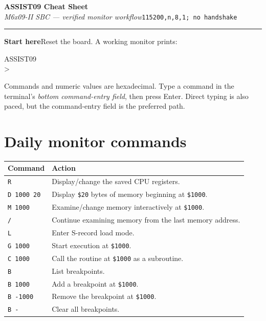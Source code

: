 \documentclass[9pt,a4paper]{article}
\newcommand{\cmd}[1]{\texttt{#1}}
\newcommand{\hex}[1]{\texttt{\$#1}}
\begin{document}
\pagestyle{empty}

{\LARGE\bfseries ASSIST09 Cheat Sheet}\\[-1pt]
\textit{M6x09-II SBC --- verified monitor workflow}\hfill\texttt{115200,n,8,1; no handshake}

\vspace{4pt}
\hrule
\vspace{5pt}

\textbf{Start here}\quad Reset the board.  A working monitor prints:

\begin{center}
\begin{minipage}{0.42\linewidth}
\ttfamily
ASSIST09\\
>
\end{minipage}
\end{center}

Commands and numeric values are hexadecimal.  Type a command in the terminal's \emph{bottom command-entry field}, then press Enter.  Direct typing is also paced, but the command-entry field is the preferred path.

\section*{Daily monitor commands}

\begin{tabularx}{\linewidth}{@{}>{\ttfamily}p{30mm}X@{}}
\toprule
\normalfont\textbf{Command} & \textbf{Action} \\
\midrule
\cmd{R} & Display/change the saved CPU registers. \\
\cmd{D 1000 20} & Display \hex{20} bytes of memory beginning at \hex{1000}. \\
\cmd{M 1000} & Examine/change memory interactively at \hex{1000}. \\
\cmd{/} & Continue examining memory from the last memory address. \\
\cmd{L} & Enter S-record load mode. \\
\cmd{G 1000} & Start execution at \hex{1000}. \\
\cmd{C 1000} & Call the routine at \hex{1000} as a subroutine. \\
\cmd{B} & List breakpoints. \\
\cmd{B 1000} & Add a breakpoint at \hex{1000}. \\
\cmd{B -1000} & Remove the breakpoint at \hex{1000}. \\
\cmd{B -} & Clear all breakpoints. \\
\bottomrule
\end{tabularx}
\end{document}
